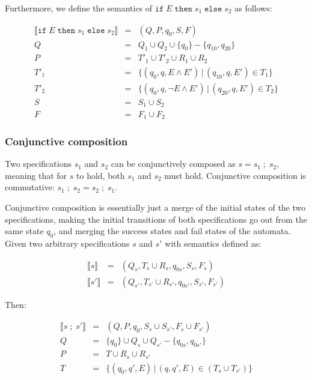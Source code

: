 Furthermore, we define the semantics of $\texttt{if} \; E \; \texttt{then} \;
s_1 \; \texttt{else} \; s_2$ as follows:

\medskip
\[
  \begin{array}{rcl}
  \llbracket \texttt{if} \; E \; \texttt{then} \; s_1 \; \texttt{else} \; s_2 \rrbracket & = & (Q, P, q_0, S, F) \\
           Q & = & Q_1 \cup Q_2 \cup \{q_0\} - \{q_{10}, q_{20}\} \\
           P & = & T'_1 \cup T'_2 \cup R_1 \cup R_2 \\
        T'_1 & = & \{(q_0, q, E       \wedge E') \, | \, (q_{10}, q, E') \in T_1\} \\
        T'_2 & = & \{(q_0, q, \neg E \wedge E') \, | \, (q_{20}, q, E') \in T_2\} \\
           S & = & S_1 \cup S_2 \\
           F & = & F_1 \cup F_2
  \end{array}
\]
\medskip




\subsubsection{Conjunctive composition}

Two specifications $s_1$ and $s_2$ can be conjunctively composed as $s = s_1 \;
; \; s_2$, meaning that for $s$ to hold, both $s_1$ and $s_2$ must hold.
Conjunctive composition is commutative: $s_1 \; ; \; s_2 = s_2 \; ; \; s_1$.

Conjunctive composition is essentially just a merge of the initial states of
the two specifications, making the initial transitions of both specifications
go out from the same state $q_0$, and merging the success states and fail
states of the automata. Given two arbitrary specifications $s$ and $s'$ with
semantics defined as:

\medskip
\[
  \begin{array}{rcl}
    \llbracket s \rrbracket & = & (Q_s, T_s \cup R_s, q_{0s}, S_s, F_s) \\
   \llbracket s' \rrbracket & = & (Q_{s'}, T_{s'} \cup R_{s'}, q_{0s'}, S_{s'}, F_{s'})
  \end{array}
\]
\medskip

Then:

\medskip
\[
  \begin{array}{rcl}
    \llbracket s \; ; \; s' \rrbracket & = & (Q, P, q_0, S_s \cup S_{s'}, F_s \cup F_{s'}) \\
                       Q & = & \{q_0\} \cup Q_s \cup Q_{s'} - \{q_{0s}, q_{0s'}\} \\
                       P & = & T \cup R_s \cup R_{s'} \\
                       T & = & \{(q_0, q', E) \, | \, (q, q', E) \in (T_s \cup T_{s'})\} \\
  \end{array}
\]
\medskip

